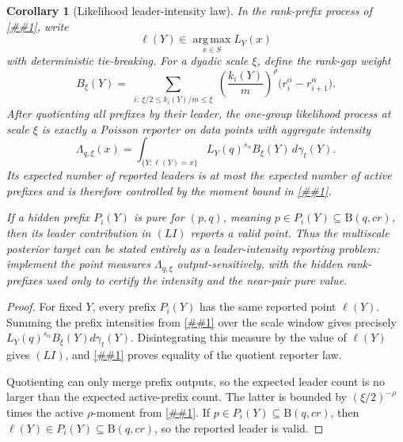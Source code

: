 \documentclass[10pt]{article}
\newcommand{\cref}[1]{\ref{##1}}
\newtheorem{corollary}[theorem]{Corollary}
\theoremstyle{definition}
\newcommand{\Ball}{\mathrm{B}}
\begin{document}
\begin{corollary}[Likelihood leader-intensity law]
   \label{cor:likelihood-leader-intensity}
   In the rank-prefix process of \cref{lem:likelihood-rank-prefix}, write
   \[
      \ell(Y)\in\operatorname*{arg\,max}_{x\in S}L_Y(x)
   \]
   with deterministic tie-breaking.  For a dyadic scale \(\xi\), define the
   rank-gap weight
   \[
      B_\xi(Y)
      =
      \sum_{\substack{i:\ \xi/2\le k_i(Y)/m\le\xi}}
      \left(\frac{k_i(Y)}m\right)^\rho
      \bigl(r_i^\alpha-r_{i+1}^\alpha\bigr).
   \]
   After quotienting all prefixes by their leader, the one-group likelihood
   process at scale \(\xi\) is exactly a Poisson reporter on data points with
   aggregate intensity
   \[
      \Lambda_{q,\xi}(x)
      =
      \int_{\{Y:\ell(Y)=x\}}
      L_Y(q)^{s_\alpha}B_\xi(Y)\,d\gamma_t(Y).
      \tag{LI}
   \]
   Its expected number of reported leaders is at most the expected number of
   active prefixes and is therefore controlled by the moment bound in
   \cref{lem:ideal-likelihood-scale-profile}.

   If a hidden prefix \(P_i(Y)\) is pure for \((p,q)\), meaning
   \(p\in P_i(Y)\subseteq\Ball(q,cr)\), then its leader contribution in
   \((LI)\) reports a valid point.  Thus the multiscale posterior target can be
   stated entirely as a leader-intensity reporting problem: implement the
   point measures \(\Lambda_{q,\xi}\) output-sensitively, with the hidden
   rank-prefixes used only to certify the intensity and the near-pair pure
   value.
\end{corollary}

\begin{proof}
   For fixed \(Y\), every prefix \(P_i(Y)\) has the same reported point
   \(\ell(Y)\).  Summing the prefix intensities from
   \cref{lem:likelihood-rank-prefix} over the scale window gives precisely
   \(L_Y(q)^{s_\alpha}B_\xi(Y)d\gamma_t(Y)\).  Disintegrating this measure by
   the value of \(\ell(Y)\) gives \((LI)\), and
   \cref{lem:poisson-leader-superposition} proves equality of the quotient
   reporter law.

   Quotienting can only merge prefix outputs, so the expected leader count is
   no larger than the expected active-prefix count.  The latter is bounded by
   \((\xi/2)^{-\rho}\) times the active \(\rho\)-moment from
   \cref{lem:ideal-likelihood-scale-profile}.  If
   \(p\in P_i(Y)\subseteq\Ball(q,cr)\), then
   \(\ell(Y)\in P_i(Y)\subseteq\Ball(q,cr)\), so the reported leader is valid.
\end{proof}
\end{document}

